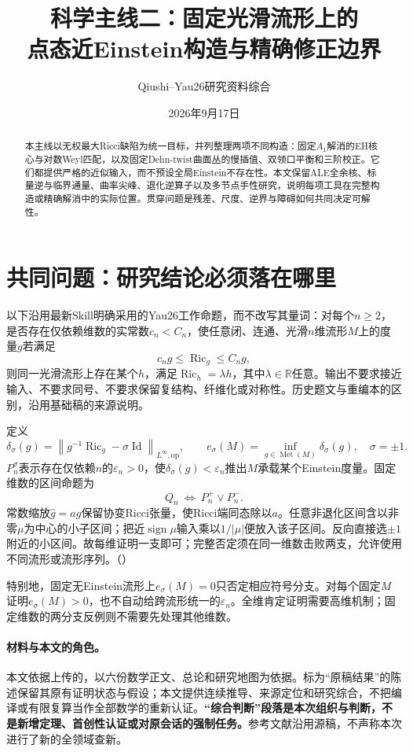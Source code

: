 \documentclass[UTF8,fontset=fandol,zihao=-4]{ctexart}
\title{科学主线二：固定光滑流形上的\\[2mm]点态近Einstein构造与精确修正边界}
\author{Qiushi--Yau26研究资料综合}
\date{2026年9月17日}
\theoremstyle{research}
\DeclareMathOperator{\Ric}{Ric}
\DeclareMathOperator{\Id}{Id}
\DeclareMathOperator{\Met}{Met}
\newcommand{\R}{\mathbb R}
\newcommand{\op}{\mathrm{op}}
\newcommand{\norm}[1]{\left\|#1\right\|}
\numberwithin{equation}{section}
\begin{document}
\maketitle
\begin{abstract}
本主线以无权最大Ricci缺陷为统一目标，并列整理两项不同构造：固定$A_1$解消的EH核心与对数Weyl匹配，以及固定Dehn-twist曲面丛的慢插值、双领口平衡和三阶校正。它们都提供严格的近似输入，而不预设全局Einstein不存在性。本文保留ALE全余核、标量逆与临界通量、曲率尖峰、退化逆算子以及多节点手性研究，说明每项工具在完整构造或精确解消中的实际位置。贯穿问题是残差、尺度、逆界与障碍如何共同决定可解性。
\end{abstract}
\tableofcontents
\clearpage

\section{共同问题：研究结论必须落在哪里}
以下沿用最新Skill明确采用的Yau26工作命题，而不改写其量词：对每个$n\ge2$，是否存在仅依赖维数的实常数$c_n<C_n$，使任意闭、连通、光滑$n$维流形$M$上的度量$g$若满足
\[
c_ng\le\Ric_g\le C_ng,
\]
则同一光滑流形上存在某个$h$，满足$\Ric_h=\lambda h$，其中$\lambda\in\R$任意。输出不要求接近输入、不要求同号、不要求保留复结构、纤维化或对称性。历史题文与重编本的区别，沿用基础稿的来源说明\cite{F,Overview}。

定义
\[
\delta_\sigma(g)=\norm{g^{-1}\Ric_g-\sigma\Id}_{L^\infty,\op},\qquad
e_\sigma(M)=\inf_{g\in\Met(M)}\delta_\sigma(g),\quad\sigma=\pm1.
\]
$P_n^\sigma$表示存在仅依赖$n$的$\varepsilon_n>0$，使$\delta_\sigma(g)<\varepsilon_n$推出$M$承载某个Einstein度量。固定维数的区间命题为
\[
Q_n\ \Longleftrightarrow\ P_n^+\lor P_n^-.
\]
常数缩放$\widehat g=ag$保留协变Ricci张量，使Ricci端同态除以$a$。任意非退化区间含以非零$\mu$为中心的小子区间；把近$\operatorname{sign}\mu$输入乘以$1/|\mu|$便放入该子区间。反向直接选$\pm1$附近的小区间。故每维证明一支即可；完整否定须在同一维数击败两支，允许使用不同流形或流形序列。\cite{F}（）

特别地，固定无Einstein流形上$e_\sigma(M)=0$只否定相应符号分支。对每个固定$M$证明$e_\sigma(M)>0$，也不自动给跨流形统一的$\varepsilon_n$。全维肯定证明需要高维机制；固定维数的两分支反例则不需要先处理其他维数。

\paragraph{材料与本文的角色。}
本文依据上传的，以六份数学正文、总论和研究地图为依据。标为“原稿结果”的陈述保留其原有证明状态与假设；本文提供连续推导、来源定位和研究综合，不把编译或有限复算当作全部数学的重新认证。\textbf{“综合判断”段落是本次组织与判断，不是新增定理、首创性认证或对原会话的强制任务。}参考文献沿用源稿，不声称本次进行了新的全领域查新。
\end{document}
